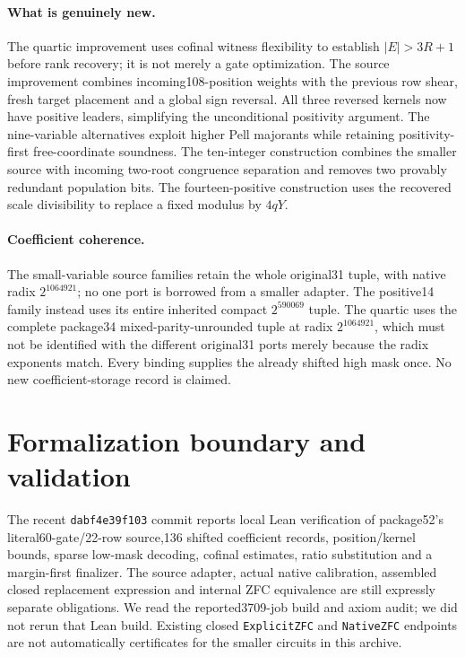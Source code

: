 \documentclass[11pt]{article}
\begin{document}
\paragraph{What is genuinely new.}
The quartic improvement uses cofinal witness flexibility to establish
$|E|>3R+1$ before rank recovery; it is not merely a gate optimization.
The source improvement combines incoming108-position weights with the
previous row shear, fresh target placement and a global sign reversal.
All three reversed kernels now have positive leaders, simplifying the
unconditional positivity argument. The nine-variable alternatives exploit
higher Pell majorants while retaining positivity-first free-coordinate
soundness. The ten-integer construction combines the smaller source with
incoming two-root congruence separation and removes two provably redundant
population bits. The fourteen-positive construction uses the recovered
scale divisibility to replace a fixed modulus by $4qY$.

\paragraph{Coefficient coherence.}
The small-variable source families retain the whole original31 tuple,
with native radix $2^{1064921}$; no one port is borrowed from a smaller
adapter. The positive14 family instead uses its entire inherited compact
$2^{590069}$ tuple. The quartic uses the complete package34
mixed-parity-unrounded tuple at radix $2^{1064921}$, which must not be
identified with the different original31 ports merely because the radix
exponents match. Every binding supplies the already shifted high mask once.
No new coefficient-storage record is claimed.









\section{Formalization boundary and validation}
The recent \texttt{dabf4e39f103} commit reports local Lean verification of
package52's literal60-gate/22-row source,136 shifted coefficient records,
position/kernel bounds, sparse low-mask decoding, cofinal estimates,
ratio substitution and a margin-first finalizer. The source adapter,
actual native calibration, assembled closed replacement expression and
internal ZFC equivalence are still expressly separate obligations. We read
the reported3709-job build and axiom audit; we did not rerun that Lean build.
Existing closed \texttt{ExplicitZFC} and \texttt{NativeZFC} endpoints are
not automatically certificates for the smaller circuits in this archive.
\end{document}
